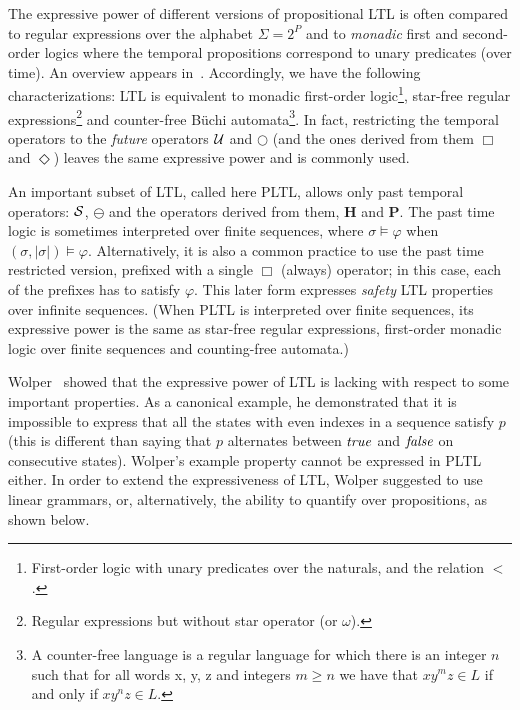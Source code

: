 The expressive power of different versions of propositional LTL is often compared to regular expressions
over the alphabet $\Sigma = 2^P$ and to  {\em monadic} first and second-order logics where the temporal propositions
correspond to unary predicates (over time). An overview appears in~\cite{Thomas}. Accordingly, we have the following characterizations:
LTL is equivalent to monadic first-order logic\footnote{First-order logic with unary predicates over the naturals, and the relation $<$.},  star-free regular expressions\footnote{Regular expressions but without star operator (or $\omega$).} and counter-free B\"{u}chi automata\footnote{A counter-free language is a regular language for which there is an integer $n$ such that for all words x, y, z and integers $m \geq n$ we have that $xy^m z \in L$ if and only if $xy^n z \in L$.}. In fact, restricting the temporal operators to the {\em future}  operators $\mathbin{\mathcal{U}}$ and $\bigcirc$
(and the ones derived from them $\Box$ and $\Diamond$)
leaves the same expressive power and is commonly used. 


An important subset of LTL, called here PLTL, allows only past temporal
operators: ${\cal S}$, $\ominus$ and the operators derived
from them, $\mathbf{H}$ and $\mathbf{P}$. The past time logic is sometimes interpreted over finite sequences, 
where $\sigma \models \varphi$ when $( \sigma , | \sigma | ) \models \varphi$.
Alternatively,
it is also a common practice to use the past time restricted version, prefixed with  a single $\Box$ (always) operator; in this case, each of the prefixes has to satisfy $\varphi$. This later
form expresses {\em safety} LTL properties~\cite{AS} over infinite sequences. 
(When PLTL is interpreted over finite sequences, its
expressive power is the same as star-free regular expressions, first-order monadic logic over finite sequences and counting-free automata.)


\label{sec:extending-prop-ltl}



Wolper~\cite{Wolper} showed that the expressive power of LTL is lacking with respect
to some important properties. As a canonical example, he demonstrated that it is impossible to
express that all the states with even indexes in a sequence
satisfy $p$ (this is
different than saying that $p$ alternates between $\mathit{true}$ and $\mathit{false}$ on consecutive states).
Wolper's example property cannot be expressed in PLTL either.
In order to extend the expressiveness of LTL, Wolper suggested to use linear grammars, or, alternatively, the ability to quantify over
propositions, as shown below.

